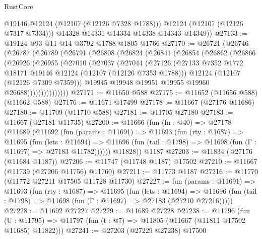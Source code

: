 \begin{lexlean}{RustCore}
\begin{coremodule}
            @19146
            @12124
            (@12107 (@12126 @7328 @1788)))
          @12124
          (@12107 (@12126 @7317 @7334)))
        @14328
        @14331
        @14334
        @14338
        @14343
        @14349))
@27133 := @19124 @93 @11 @14 @3792 @1788 @1805 @1766
@27170 := @26721
    (@26746
      (@26787
        (@26789
          (@26791
            (@26808
              (@26824
                (@26841
                  (@26854
                    (@26862
                      (@26866
                        (@26926
                          (@26955
                            (@27010
                              (@27037
                                (@27044
                                  (@27126
                                    (@27133
                                      @7352
                                      @1772
                                      @18171
                                      @19146
                                      @12124
                                      (@12107 (@12126 @7353 @1788)))
                                    @12124
                                    (@12107 (@12126 @7309 @7359)))
                                  @19945
                                  @19948
                                  @19951
                                  @19955
                                  @19960
                                  @26688)))))))))))))))
@27171 := @11650 @588
@27175 := @11652 (@11656 @588) (@11662 @588)
@27176 := @11671 @17499
@27178 := @11667 (@27176 @11686)
@27180 := @11709 (@11710 @588)
@27181 := @11705 @27180
@27183 := @11667 (@27181 @11735)
@27200 := @11666
    (fun (fn : @40) =>
    @27178
      (@11689
        (@11692
          (fun (params : @11691) =>
          @11693
            (fun (rty : @1687) =>
            @11695
              (fun (lets : @11694) =>
              @11696 (fun (tail : @1798) => @11698 (fun (Γ : @11697) => @27183 @11782))))))
        @11828))
    @1187
@27203 := @11834 (@27176 (@11684 @1187))
@27206 := @11747 (@11748 @1187) @17502
@27210 := @11667 (@11739 (@27206 @11756) @11760)
@27211 := @11773 @1187
@27216 := @11770 (@11772 @27211 @17505 @11728 @11730)
@27227 := fun (params : @11691) =>
  @11693
    (fun (rty : @1687) =>
    @11695
      (fun (lets : @11694) =>
      @11696 (fun (tail : @1798) => @11698 (fun (Γ : @11697) => @27183 (@27210 @27216)))))
@27228 := @11692 @27227
@27229 := @11689 @27228
@27238 := @11796
    (fun (U : @11795) => @11797 (fun (t : @7) => @11805 (@11667 (@11811 @17502 @11685) @11822)))
@27241 := @27203 (@27229 @27238) @17500

\end{coremodule}
\end{lexlean}
